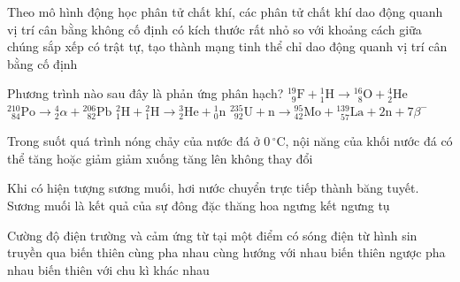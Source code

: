 	\begin{ex}%
		Theo mô hình động học phân tử chất khí, các phân tử chất khí
		\choice
		{dao động quanh vị trí cân bằng không cố định}
		{\True có kích thước rất nhỏ so với khoảng cách giữa chúng}
		{sắp xếp có trật tự, tạo thành mạng tinh thể}
		{chỉ dao động quanh vị trí cân bằng cố định}
	\end{ex}

	\begin{ex}%
		Phương trình nào sau đây là phản ứng phân hạch?
		\choice
		{${}^{19}_{\phantom{1}9}\text{F}+{}^1_1\text{H}\to{}^{16}_{\phantom{1}8}\text{O}+{}^4_2\text{He}$}
		{${}^{210}_{\phantom{1}84}\text{Po}\to{}^4_2\alpha+{}^{206}_{\phantom{2}82}\text{Pb}$}
		{${}^2_1\text{H}+{}^2_1\text{H}\to{}^3_2\text{He}+{}^1_0\text{n}$}
		{\True ${}^{235}_{\phantom{2}92}\text{U}+\text{n}\to{}^{95}_{42}\text{Mo}+{}^{139}_{\phantom{1}57}\text{La}+2\text{n}+7\beta^-$}
	\end{ex}

	\begin{ex}%
		Trong suốt quá trình nóng chảy của nước đá ở $0\,^\circ\text{C}$, nội năng của khối nước đá
		\choice
		{có thể tăng hoặc giảm}
		{giảm xuống}
		{\True tăng lên}
		{không thay đổi}
	\end{ex}

	\begin{ex}%
		Khi có hiện tượng sương muối, hơi nước chuyển trực tiếp thành băng tuyết. Sương muối là kết quả của sự
		\choice
		{đông đặc}
		{thăng hoa}
		{\True ngưng kết}
		{ngưng tụ}
	\end{ex}

	\begin{ex}%
		Cường độ điện trường và cảm ứng từ tại một điểm có sóng điện từ hình sin truyền qua
		\choice
		{\True biến thiên cùng pha nhau}
		{cùng hướng với nhau}
		{biến thiên ngược pha nhau}
		{biến thiên với chu kì khác nhau}
	\end{ex}

